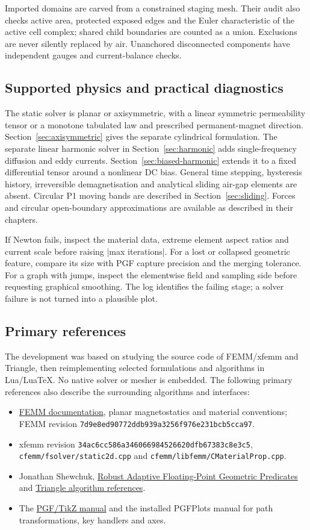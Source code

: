 Imported domains are carved from a constrained staging mesh. Their audit also
checks active area, protected exposed edges and the Euler characteristic of the
active cell complex; shared child boundaries are counted as a union. Exclusions
are never silently replaced by air. Unanchored disconnected components have
independent gauges and current-balance checks.

\subsection{Supported physics and practical diagnostics}
The static solver is planar or axisymmetric, with a linear symmetric permeability
tensor or a monotone tabulated law and prescribed permanent-magnet direction.
Section~\ref{sec:axisymmetric} gives the separate cylindrical formulation.
The separate linear harmonic solver in Section~\ref{sec:harmonic} adds
single-frequency diffusion and eddy currents. Section~\ref{sec:biased-harmonic}
extends it to a fixed differential tensor around a nonlinear DC bias.
General time stepping, hysteresis
history, irreversible demagnetisation and analytical sliding air-gap elements
are absent. Circular P1 moving bands are described in Section~\ref{sec:sliding}. Forces and circular
open-boundary approximations are available as described in their chapters.

If Newton fails, inspect the material data, extreme element aspect ratios
and current scale before raising |max iterations|. For a lost or collapsed
geometric feature, compare its size with PGF capture precision and the
merging tolerance. For a graph with jumps, inspect the elementwise field
and sampling side before requesting graphical smoothing. The log identifies
the failing stage; a solver failure is not turned into a plausible plot.

\subsection{Primary references}
The development was based on studying the source code of FEMM/xfemm
and Triangle, then reimplementing selected formulations and algorithms
in Lua/LuaTeX. No native solver or mesher is embedded. The following primary references
also describe the surrounding algorithms and interfaces:
\begin{itemize}
\item \href{https://www.femm.info/wiki/Documentation}{FEMM documentation},
  planar magnetostatics and material conventions; FEMM revision
  \nolinkurl{7d9e8ed90772ddb939a3256f976e231bcb5cca97}.
\item xfemm revision \nolinkurl{34ac6cc586a346066984526620dfb67383c8e3c5},
  \nolinkurl{cfemm/fsolver/static2d.cpp} and
  \nolinkurl{cfemm/libfemm/CMaterialProp.cpp}.
\item Jonathan Shewchuk,
  \href{https://www.cs.cmu.edu/~quake/robust.html}{Robust Adaptive Floating-Point Geometric Predicates}
  and \href{https://www.cs.cmu.edu/~quake/triangle.research.html}{Triangle algorithm references}.
\item The \href{https://tikz.dev}{PGF/TikZ manual} and the installed
  PGFPlots manual for path transformations, key handlers and axes.
\end{itemize}

